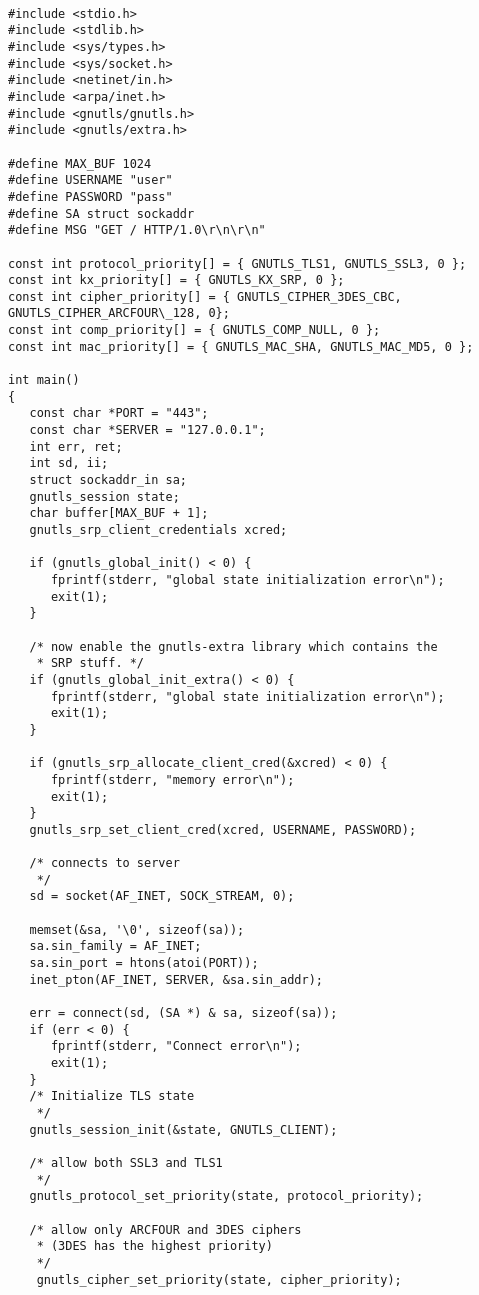 \begin{verbatim}

#include <stdio.h>
#include <stdlib.h>
#include <sys/types.h>
#include <sys/socket.h>
#include <netinet/in.h>
#include <arpa/inet.h>
#include <gnutls/gnutls.h>
#include <gnutls/extra.h>

#define MAX_BUF 1024
#define USERNAME "user"
#define PASSWORD "pass"
#define SA struct sockaddr
#define MSG "GET / HTTP/1.0\r\n\r\n"

const int protocol_priority[] = { GNUTLS_TLS1, GNUTLS_SSL3, 0 };
const int kx_priority[] = { GNUTLS_KX_SRP, 0 };
const int cipher_priority[] = { GNUTLS_CIPHER_3DES_CBC, GNUTLS_CIPHER_ARCFOUR\_128, 0};
const int comp_priority[] = { GNUTLS_COMP_NULL, 0 };
const int mac_priority[] = { GNUTLS_MAC_SHA, GNUTLS_MAC_MD5, 0 };

int main()
{
   const char *PORT = "443";
   const char *SERVER = "127.0.0.1";
   int err, ret;
   int sd, ii;
   struct sockaddr_in sa;
   gnutls_session state;
   char buffer[MAX_BUF + 1];
   gnutls_srp_client_credentials xcred;

   if (gnutls_global_init() < 0) {
      fprintf(stderr, "global state initialization error\n");
      exit(1);
   }

   /* now enable the gnutls-extra library which contains the
    * SRP stuff. */
   if (gnutls_global_init_extra() < 0) {
      fprintf(stderr, "global state initialization error\n");
      exit(1);
   }

   if (gnutls_srp_allocate_client_cred(&xcred) < 0) {
      fprintf(stderr, "memory error\n");
      exit(1);
   }
   gnutls_srp_set_client_cred(xcred, USERNAME, PASSWORD);

   /* connects to server 
    */
   sd = socket(AF_INET, SOCK_STREAM, 0);

   memset(&sa, '\0', sizeof(sa));
   sa.sin_family = AF_INET;
   sa.sin_port = htons(atoi(PORT));
   inet_pton(AF_INET, SERVER, &sa.sin_addr);

   err = connect(sd, (SA *) & sa, sizeof(sa));
   if (err < 0) {
      fprintf(stderr, "Connect error\n");
      exit(1);
   }
   /* Initialize TLS state 
    */
   gnutls_session_init(&state, GNUTLS_CLIENT);

   /* allow both SSL3 and TLS1
    */
   gnutls_protocol_set_priority(state, protocol_priority);
 
   /* allow only ARCFOUR and 3DES ciphers
    * (3DES has the highest priority)
    */
    gnutls_cipher_set_priority(state, cipher_priority);


\end{verbatim}
